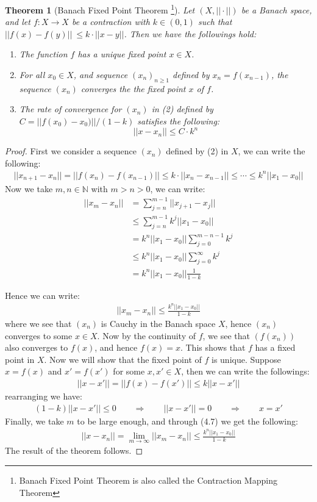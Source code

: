 \documentclass[11pt]{book}
\theoremstyle{break}
\theoremstyle{break}
\newtheorem{thm}{Theorem}[section]
\newcommand{\N}{\mathbb{N}}
\begin{document}
\begin{thm}[Banach Fixed Point Theorem \footnote{Banach Fixed Point Theorem is also called the Contraction Mapping Theorem}]
Let $(X,||\cdot ||)$ be a Banach space, and let $f:X \to X$ be a contraction with $k \in (0,1)$ such that $||f(x) - f(y) ||\ \leq k\cdot ||x-y||$. Then we have the followings hold:
\begin{enumerate}[topsep=3pt,itemsep=-1ex,partopsep=1ex,parsep=1ex]
\item The function $f$ has a unique fixed point $x \in X$.
\item For all $x_0\in X$, and sequence $(x_n)_{n\geq 1}$ defined by $x_{n} = f(x_{n-1})$, the sequence $(x_n)$ converges the the fixed point $x$ of $f$.
\item The rate of convergence for $(x_n)$ in (2) defined by $C = ||f(x_0) - x_0)|| /(1-k)$ satisfies the following:
$$||x-x_n||\leq C\cdot k^n$$
\end{enumerate}
\end{thm}
\begin{proof}
First we consider a sequence $(x_n)$ defined by (2) in $X$, we can write the following: 
\begin{align*}
||x_{n+1}-x_n|| = ||f(x_n) - f(x_{n-1}) || \leq k \cdot ||x_n - x_{n-1}|| \leq \cdots \leq k^{n}||x_1 - x_0||
\end{align*}
Now we take $m,n \in \N$ with $m>n>0$, we can write:
\begin{align*}
||x_m - x_n|| &= \sum_{j=n}^{m-1} ||x_{j+1} - x_j|| \\
&\leq \sum_{j=n}^{m-1}k^j ||x_1 - x_0||\\
&= k^n ||x_1 - x_0|| \sum_{j=0}^{m-n-1} k^j \\
&\leq  k^n ||x_1 - x_0|| \sum_{j=0}^{\infty} k^j \\
&= k^n ||x_1 - x_0|| \frac{1}{1-k}
\end{align*}

Hence we can write:
\begin{align}
||x_m - x_n|| \leq \frac{k^n||x_1 - x_0||}{1-k}
\end{align}
where we see that $(x_n)$ is Cauchy in the Banach space $X$, hence $(x_n)$ converges to some $x \in X$. Now by the continuity of $f$, we see that $(f(x_n))$ also converges to $f(x)$, and hence $f(x) = x$. This shows that $f$ has a fixed point in $X$. Now we will show that the fixed point of $f$ is unique. Suppose $x=f(x)$ and $x'  = f(x')$ for some $x,x' \in X$, then we can write the followings:
\begin{align*}
||x- x'|| = ||f(x) - f(x')|| \leq k ||x-x'||
\end{align*}
rearranging we have:
\begin{align*}
(1-k) ||x-x'|| \leq 0 \qquad \Rightarrow \qquad ||x-x'|| = 0 \qquad\Rightarrow \qquad x= x'
\end{align*}
Finally, we take $m$ to be large enough, and through (4.7) we get the following:
\begin{align*}
||x-x_n|| = \lim_{m\to \infty} ||x_m - x_n|| \leq \frac{k^n ||x_1 - x_0||}{1-k}
\end{align*}
The result of the theorem follows. 
\end{proof}
\end{document}
